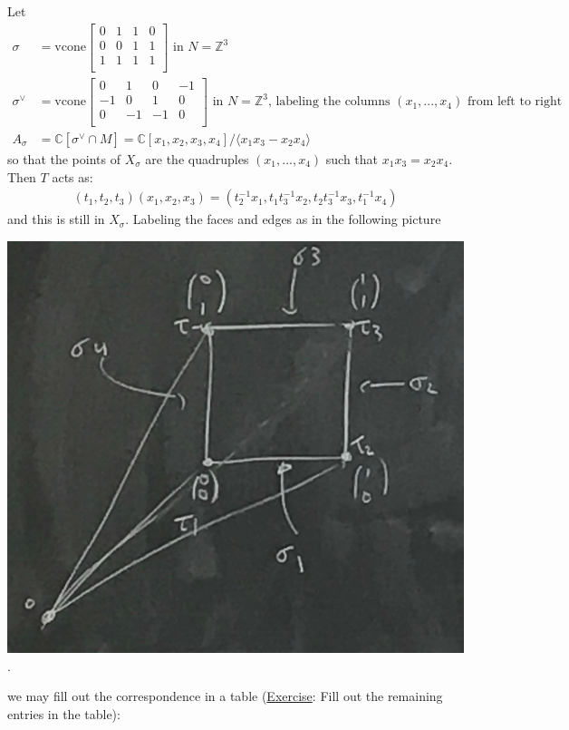 \documentclass[a4paper,12pt]{amsart}
\newcommand{\ZZ}{\mathbb{Z}}
\newcommand{\CC}{\mathbb{C}}
\begin{document}
\begin{Eg}
Let
\begin{align*}
\sigma &= \text{vcone} \begin{bmatrix}
0 & 1 & 1 & 0 \\
0 & 0 & 1 & 1 \\
1 & 1 & 1 & 1 \\
\end{bmatrix} \text{ in } N = \ZZ^3 \\
\sigma^\vee &= \text{vcone} \begin{bmatrix}
0 & 1 & 0 & -1 \\
-1 & 0 & 1 & 0 \\
0 & -1 & -1 & 0 \\
\end{bmatrix} \text{ in } N = \ZZ^3 \text{, labeling the columns } (x_1, ..., x_4) \text{ from left to right } \\
A_\sigma &= \CC[\sigma^\vee \cap M] = \CC[x_1, x_2, x_3, x_4] / \langle x_1 x_3 - x_2 x_4 \rangle
\end{align*}
so that the points of $X_\sigma$ are the quadruples $(x_1, ..., x_4)$ such that $x_1 x_3 = x_2 x_4$. Then $T$ acts as:
\begin{align*}
	(t_1, t_2, t_3) (x_1, x_2, x_3) = (t_2^{-1} x_1, t_1 t_3^{-1} x_2, t_2 t_3^{-1} x_3, t_1^{-1} x_4)
\end{align*}
and this is still in $X_\sigma$. Labeling the faces and edges as in the following picture 
\begin{center}
\includegraphics[scale=0.4]{pic/toricvar_feb12_2}.
\end{center}
we may fill out the correspondence in a table (\underline{Exercise}: Fill out the remaining entries in the table):


\end{Eg}
\end{document}
